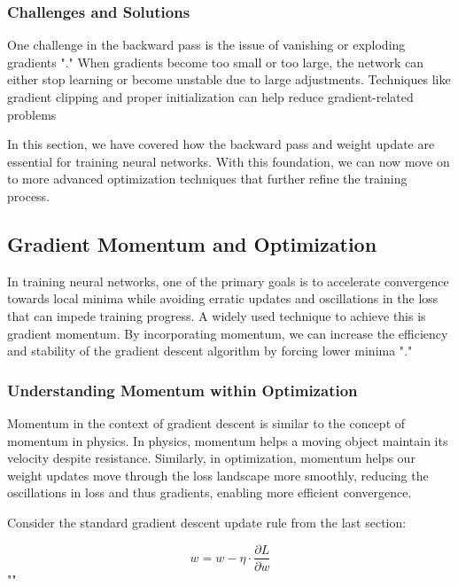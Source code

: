 \subsubsection*{Challenges and Solutions}

One challenge in the backward pass is the issue of vanishing or exploding gradients "\cite{he2015delvingdeeprectifierssurpassing}." When gradients become too small or too large, the network can either stop learning or become unstable due to large adjustments. Techniques like gradient clipping and proper initialization can help reduce gradient-related problems

In this section, we have covered how the backward pass and weight update are essential for training neural networks. With this foundation, we can now move on to more advanced optimization techniques that further refine the training process.

\subsection*{Gradient Momentum and Optimization}

In training neural networks, one of the primary goals is to accelerate convergence towards local minima while avoiding erratic updates and oscillations in the loss that can impede training progress. A widely used technique to achieve this is gradient momentum. By incorporating momentum, we can increase the efficiency and stability of the gradient descent algorithm by forcing lower minima "\cite{loshchilov2019decoupledweightdecayregularization}."

\subsubsection*{Understanding Momentum within Optimization}

Momentum in the context of gradient descent is similar to the concept of momentum in physics. In physics, momentum helps a moving object maintain its velocity despite resistance. Similarly, in optimization, momentum helps our weight updates move through the loss landscape more smoothly, reducing the oscillations in loss and thus gradients, enabling more efficient convergence.

Consider the standard gradient descent update rule from the last section:

\[w = w - \eta \cdot \frac{\partial L}{\partial w}\]
"\cite{loshchilov2019decoupledweightdecayregularization}"

